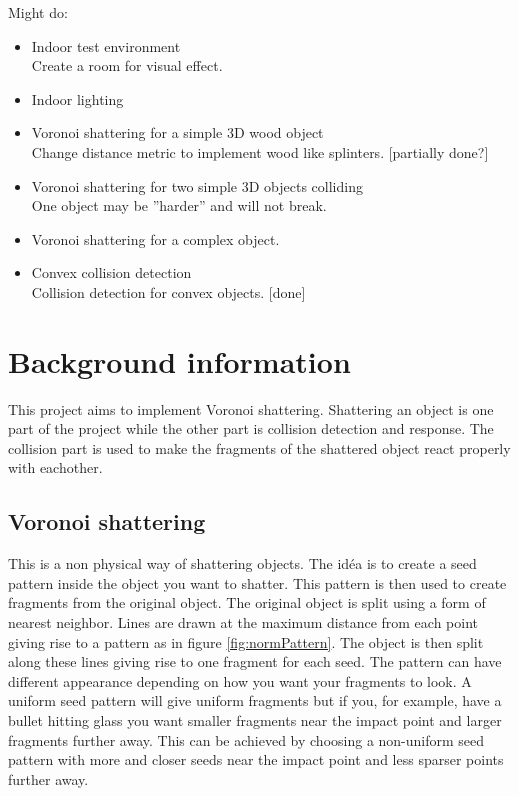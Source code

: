 \documentclass[10pt]{article}
\begin{document}
Might do:
\begin{itemize}

  \item Indoor test environment \hfill \\
  Create a room for visual effect.
  \item Indoor lighting
  \item Voronoi shattering for a simple 3D wood object \hfill \\
  Change distance metric to implement wood like splinters. [partially done?]
  \item Voronoi shattering for two simple 3D objects colliding \hfill \\
  One object may be ”harder” and will not break.
  \item Voronoi shattering for a complex object.
  \item Convex collision detection \hfill \\
  Collision detection for convex objects. [done]

\end{itemize}

\section{Background information}
This project aims to implement Voronoi shattering. Shattering an object is one
part of the project while the other part is collision detection and response.
The collision part is used to make the fragments of the shattered object react
properly with eachother.

\subsection{Voronoi shattering}
This is a non physical way of shattering objects. The idéa is to create a
seed pattern inside the object you want to shatter. This pattern is then used
to create fragments from the original object. The original object is split using
a form of nearest neighbor. Lines are drawn at the maximum distance from each
point giving rise to a pattern as in figure \ref{fig:normPattern}. The object
is then split along these lines giving rise to one fragment for each seed.
The pattern can have different appearance depending on how you want your
fragments to look. A uniform seed pattern will give uniform fragments but if
you, for example, have a bullet hitting glass you want smaller fragments near
the impact point and larger fragments further away. This can be achieved by
choosing a non-uniform seed pattern with more and closer seeds near the impact
point and less sparser points further away.
\end{document}
